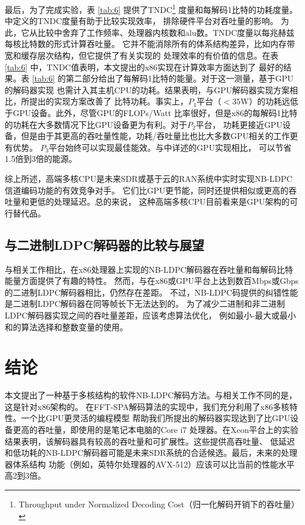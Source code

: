 \documentclass{cjc}
\begin{document}
  最后，为了完成实验，表 \ref{tab:6} 提供了TNDC\footnote{Throughput under Normalized Decoding Cost（归一化解码开销下的吞吐量）\cite{noauthor_ying_nodate}}
  度量和每解码1比特的功耗度量。\cite{noauthor_ying_nodate}中定义的TNDC度量有助于比较实现效率，
  排除硬件平台对吞吐量的影响\cite{gal_high-throughput_2016,noauthor_cassagne_nodate,noauthor_ying_nodate,gal_high_2014,noauthor_peng_nodate}。
  为此，它从比较中舍弃了工作频率、处理器内核数和alu数。TNDC度量以每兆赫兹每核比特数的形式计算吞吐量。
  它并不能消除所有的体系结构差异，比如内存带宽和缓存层次结构，但它提供了有关实现的
  处理效率的有价值的信息。在表 \ref{tab:6} 中，TNDC值表明，本文提出的x86实现在计算效率方面达到了
  最好的结果。表 \ref{tab:6} 的第二部分给出了每解码1比特的能量。对于这一测量，基于GPU的解码器实现
  也需计入其主机CPU的功耗。结果表明，与GPU解码器实现方案相比，所提出的实现方案改善了
  比特功耗。事实上，$P_1$平台（$<35$W）的功耗远低于GPU设备。此外，尽管GPU的FLOPs/Watt
  比率很好，但是x86的每解码1比特的功耗在大多数情况下比GPU设备更为有利。对于$P_2$平台，
  功耗更接近GPU设备，但是由于其更高的吞吐量性能，功耗/吞吐量比也比大多数GPU相关的工作更有优势。
  $P_3$平台始终可以实现最佳能效。与\cite{liu_high-throughput_2018}中详述的GPU实现相比，
  可以节省1.5倍到3倍的能源。

  综上所述，高端多核CPU是未来SDR或基于云的RAN系统中实时实现NB-LDPC信道编码功能的有效竞争对手。
  它们比GPU更节能，同时还提供相似或更高的吞吐量和更低的处理延迟。总的来说，
  这种高端多核CPU目前看来是GPU架构的可行替代品。

\subsection{与二进制LDPC解码器的比较与展望}

  与相关工作相比，在x86处理器上实现的NB-LDPC解码器在吞吐量和每解码比特能量方面提供了有趣的特性。
  然而，与在x86或GPU平台上达到数百Mbps或Gbps的二进制LDPC解码器相比，仍然存在差距。
  不过，NB-LDPC码提供的纠错性能是二进制LDPC解码器在同等帧长下无法达到的。
  为了减少二进制和非二进制LDPC解码器实现之间的吞吐量差距，应该考虑算法优化，
  例如最小-最大或最小和的算法选择和整数变量的使用。

\section{结论}
  本文提出了一种基于多核结构的软件NB-LDPC解码方法。与相关工作不同的是，这是针对x86架构的。
  在FFT-SPA解码算法的实现中，我们充分利用了x86多核特性。一个比GPU更灵活的编程模型
  帮助我们所提出的解码器实现达到了比GPU设备更高的吞吐量，即使用的是笔记本电脑的Core i7
  处理器。在Xeon平台上的实验结果表明，该解码器具有较高的吞吐量和可扩展性。这些提供高吞吐量、
  低延迟和低功耗的NB-LDPC解码器可能是未来SDR系统的合适候选。最后，未来的处理器体系结构
  功能（例如，英特尔处理器的AVX-512）应该可以比当前的性能水平高2到3倍。
\end{document}
